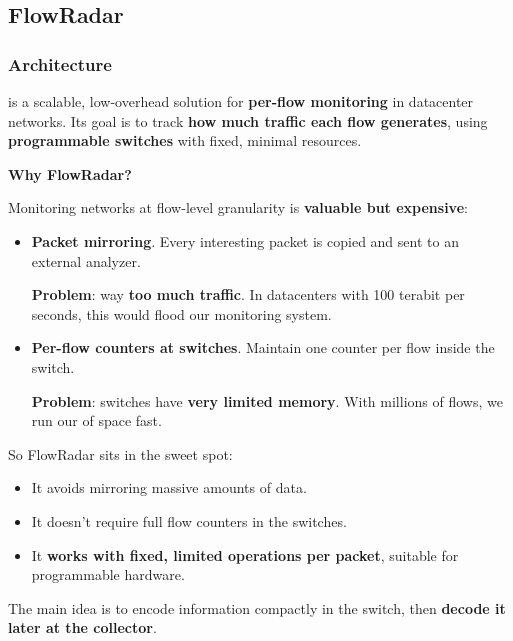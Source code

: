 \subsection{FlowRadar}

\subsubsection{Architecture}

\cite{10.5555/2930611.2930632} is a scalable, low-overhead solution for \textbf{per-flow monitoring} in datacenter networks. Its goal is to track \textbf{how much traffic each flow generates}, using \textbf{programmable switches} with fixed, minimal resources.

\highspace
\begin{flushleft}
    \textcolor{Green3}{ \textbf{Why FlowRadar?}}
\end{flushleft}
Monitoring networks at flow-level granularity is \textbf{valuable but expensive}:
\begin{itemize}
    \item[\textcolor{Red2}{\faIcon{times}}] \textcolor{Red2}{\textbf{Packet mirroring}}. Every interesting packet is copied and sent to an external analyzer.

    \textcolor{Red2}{ \textbf{Problem}}: way \textbf{too much traffic}. In datacenters with 100 terabit per seconds, this would flood our monitoring system.


    \item[\textcolor{Red2}{\faIcon{times}}] \textcolor{Red2}{\textbf{Per-flow counters at switches}}. Maintain one counter per flow inside the switch.

    \textcolor{Red2}{ \textbf{Problem}}: switches have \textbf{very limited memory}. With millions of flows, we run our of space fast.
\end{itemize}
So FlowRadar sits in the sweet spot:
\begin{itemize}[label=\textcolor{Green3}{}]
    \item It avoids mirroring massive amounts of data.
    \item It doesn't require full flow counters in the switches.
    \item It \textbf{works with fixed, limited operations per packet}, suitable for programmable hardware.
\end{itemize}
The main idea is to encode information compactly in the switch, then \textbf{decode it later at the collector}.

